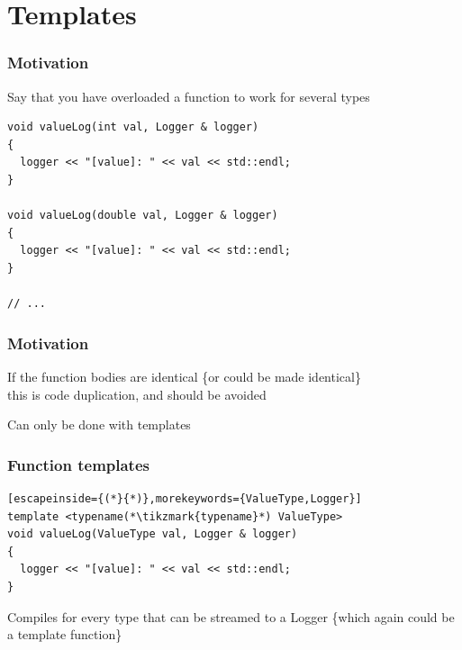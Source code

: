 \documentclass[14pt,a4paper,dvipsnames,usenames]{beamer}
\begin{document}
\section{Templates}

\frame[plain]{\sectionpage}

\begin{frame}[fragile]
  \frametitle{Motivation}

  Say that you have overloaded a function to work for several types

  \vspace{.5em}
  \begin{lstlisting}[morekeywords={Logger}]
void valueLog(int val, Logger & logger)
{
  logger << "[value]: " << val << std::endl;
}

void valueLog(double val, Logger & logger)
{
  logger << "[value]: " << val << std::endl;
}

// ... 
  \end{lstlisting}
  
\end{frame}

\begin{frame}[fragile]
  \frametitle{Motivation}

  If the function bodies are identical
  {\fontsize{8pt}{8pt}\selectfont \{or could be made identical\}}\\
  this is {\color{Marty}code duplication}, and should be avoided

  \vspace{1cm}
  Can only be done with {\color{FeebleWeek}templates}

\end{frame}

\begin{frame}[fragile]
  \frametitle{Function templates}

  \begin{lstlisting}[escapeinside={(*}{*)},morekeywords={ValueType,Logger}]
template <typename(*\tikzmark{typename}*) ValueType>
void valueLog(ValueType val, Logger & logger)
{
  logger << "[value]: " << val << std::endl;
}
  \end{lstlisting}

  \vspace{1em}
  Compiles for every type that can be streamed to a Logger
  {\fontsize{8pt}{8pt}\selectfont\{which again could be a template function\}}

  \nointerlineskip
  
\end{frame}
\end{document}
